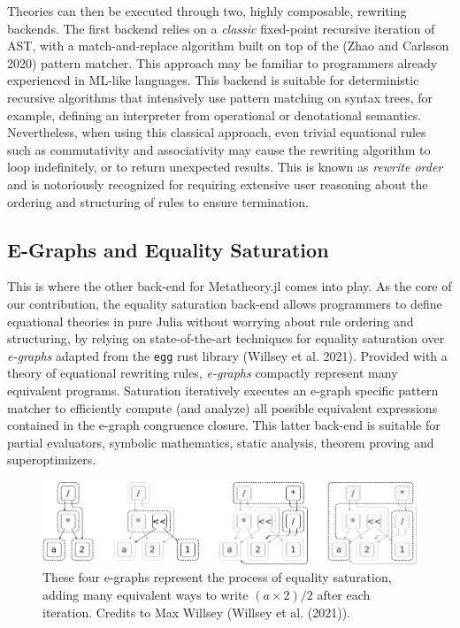 \documentclass[
]{article}
\begin{document}
Theories can then be executed through two, highly composable, rewriting
backends. The first backend relies on a \emph{classic} fixed-point
recursive iteration of AST, with a match-and-replace algorithm built on
top of the (Zhao and Carlsson 2020) pattern matcher. This approach may
be familiar to programmers already experienced in ML-like languages.
This backend is suitable for deterministic recursive algorithms that
intensively use pattern matching on syntax trees, for example, defining
an interpreter from operational or denotational semantics. Nevertheless,
when using this classical approach, even trivial equational rules such
as commutativity and associativity may cause the rewriting algorithm to
loop indefinitely, or to return unexpected results. This is known as
\emph{rewrite order} and is notoriously recognized for requiring
extensive user reasoning about the ordering and structuring of rules to
ensure termination.

\hypertarget{e-graphs-and-equality-saturation}{%
\subsection{E-Graphs and Equality
Saturation}\label{e-graphs-and-equality-saturation}}

This is where the other back-end for Metatheory.jl comes into play. As
the core of our contribution, the equality saturation back-end allows
programmers to define equational theories in pure Julia without worrying
about rule ordering and structuring, by relying on state-of-the-art
techniques for equality saturation over \emph{e-graphs} adapted from the
\texttt{egg} rust library (Willsey et al. 2021). Provided with a theory
of equational rewriting rules, \emph{e-graphs} compactly represent many
equivalent programs. Saturation iteratively executes an e-graph specific
pattern matcher to efficiently compute (and analyze) all possible
equivalent expressions contained in the e-graph congruence closure. This
latter back-end is suitable for partial evaluators, symbolic
mathematics, static analysis, theorem proving and superoptimizers.

\begin{figure}
\centering
\includegraphics{egraphs.png}
\caption{These four e-graphs represent the process of equality
saturation, adding many equivalent ways to write \((a \times 2) / 2\)
after each iteration. Credits to Max Willsey (Willsey et al.
(2021)).\label{fig:egggg}}
\end{figure}
\end{document}
